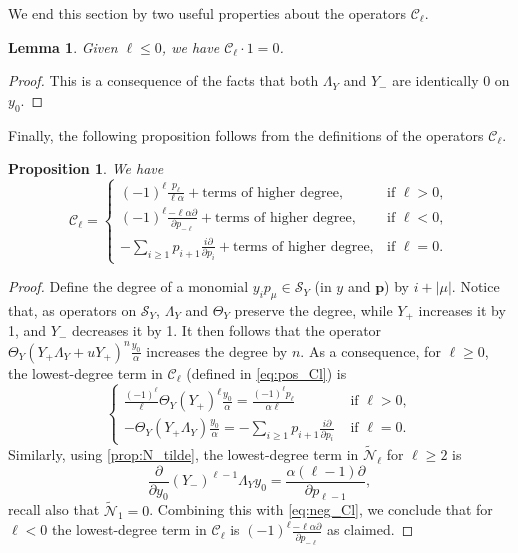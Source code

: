 \documentclass[12pt]{amsart}
\newtheorem{lem}[thm]{Lemma}
\newtheorem{prop}[thm]{Proposition}
\theoremstyle{remark}
\newcommand{\bfp}{\boldsymbol{p}}
\newcommand{\C}{\mathcal C}
\newcommand{\mcS}{\mathcal{S}}
\newcommand{\tN}{{\mathcal{\widetilde N}}}
\begin{document}
We end this section by two useful properties about the operators $\C_\ell$.
\begin{lem}\label{lem:action_1}
    Given $\ell\leq 0$, we have $\C_{\ell}\cdot 1=0$.
\end{lem}
\begin{proof}
    This is a consequence of the facts that both $\Lambda_Y$ and $Y_-$ are identically 0 on $y_0.$
\end{proof}
Finally, the following proposition follows from the definitions of the operators $\C_\ell$.
\begin{prop}\label{prop:lowest_terms}
    We have
    $$\C_\ell=\begin{cases}
        (-1)^\ell\frac{p_\ell}{\ell\alpha}+\text{terms of higher degree}, &\text{if $\ell>0$},\\
        (-1)^\ell\frac{-\ell\alpha\partial}{\partial p_{-\ell}}+\text{terms of higher degree}, &\text{if $\ell<0$},\\
        -\sum_{i\geq 1}p_{i+1}\frac{i\partial}{\partial p_i}+\text{terms of higher degree},&\text{if $\ell=0$}.
    \end{cases}$$
\end{prop}
\begin{proof}
Define the degree of a monomial $y_ip_\mu\in \mcS_Y$ (in $y$ and $\bfp$) by $i+|\mu|$.
    Notice that, as operators on $\mcS_Y$,  $\Lambda_Y$ and $\Theta_Y$  preserve the degree, while $Y_+$ increases it by 1, and $Y_-$ decreases it by 1. It then follows that the operator $\Theta_Y\left(Y_+\Lambda_Y+u Y_+\right)^{n}\frac{y_0}{\alpha}$ increases the degree by $n$. As a consequence, for $\ell\geq0$, the lowest-degree term in $\C_\ell$ (defined in \cref{eq:pos_Cl}) is
    $$
    \begin{cases}
    \frac{(-1)^{\ell}}{\ell}\Theta_Y\left(Y_+\right)^{\ell}\frac{y_0}{\alpha}=\frac{(-1)^\ell p_\ell}{\alpha\ell} &\text{ if $\ell>0$},\\
    -\Theta_Y\left(Y_+\Lambda_Y\right)\frac{y_0}{\alpha}=-\sum_{i\geq 1}p_{i+1}\frac{i\partial}{\partial p_i}&\text{ if $\ell=0$.}
    \end{cases}
    $$
    Similarly, using \cref{prop:N_tilde}, the lowest-degree term in $\tN_\ell$ for $\ell\geq 2$ is 
    $$\frac{\partial}{\partial y_0} (Y_-)^{\ell-1}\Lambda_Y y_0=\frac{\alpha (\ell-1)\partial}{\partial p_{\ell-1}},$$
    recall also that $\tN_1=0$.
Combining this with \cref{eq:neg_Cl}, we conclude that for $\ell<0$ the lowest-degree term in $\C_\ell$ is $(-1)^\ell\frac{-\ell\alpha \partial}{\partial p_{-\ell}}$ as claimed.
\end{proof}
\end{document}
